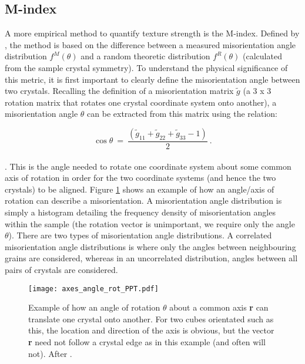 \documentclass[a4paper,12pt,twoside]{report}
\numberwithin{equation}{chapter}
\begin{document}
\subsection{M-index} \label{subsec:Mindex}
A more empirical method to quantify texture strength is the M-index. Defined by \cite{Skemer}, the method is based on the difference between a measured misorientation angle distribution $f^M(\theta)$ and a random theoretic distribution $f^R(\theta)$ (calculated from the sample crystal symmetry). To understand the physical significance of this metric, it is first important to clearly define the misorientation angle between two crystals. Recalling the definition of a misorientation matrix $\tilde{g}$ (a 3 x 3 rotation matrix that rotates one crystal coordinate system onto another), a misorientation angle $\theta$ can be extracted from this matrix using the relation:

\begin{equation} \label{eq:misorientation_angle}
\cos{\theta}\ =\ \frac{(\tilde{g}_{11} + \tilde{g}_{22} + \tilde{g}_{33} - 1)}{2}\ .
\end{equation} 
\\
\citep{Randle2000}. This is the angle needed to rotate one coordinate system about some common axis of rotation in order for the two coordinate systems (and hence the two crystals) to be aligned. Figure \ref{fig:angle-axis_example} shows an example of how an angle/axis of rotation can describe a misorientation. A misorientation angle distribution is simply a histogram detailing the frequency density of misorientation angles within the sample (the rotation vector is unimportant, we require only the angle $\theta$). There are two types of misorientation angle distributions. A correlated misorientation angle distributions is where only the angles between neighbouring grains are considered, whereas in an uncorrelated distribution, angles between all pairs of crystals are considered.

\begin{figure}[h]
  \centering
    \texttt{[image: axes\_angle\_rot\_PPT.pdf]}
  \caption[Angle/axis of rotation example]{Example of how an angle of rotation $\theta$ about a common axis \textbf{r} can translate one crystal onto another. For two cubes orientated such as this, the location and direction of the axis is obvious, but the vector \textbf{r} need not follow a crystal edge as in this example (and often will not). After \cite{Randle2000}.}
  \label{fig:angle-axis_example}
\end{figure}
\end{document}
